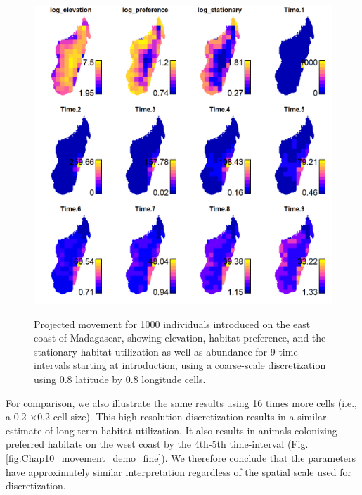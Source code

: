 \begin{figure}[!ht]
    \caption[Projected movement for using a coarse spatial resolution]{Projected movement for 1000 individuals introduced on the east coast of Madagascar, showing elevation, habitat preference, and the stationary habitat utilization as well as abundance for 9 time-intervals starting at introduction, using a coarse-scale discretization using 0.8 latitude by 0.8 longitude cells.}
    \includegraphics[width=5.5in]{Chap_10/Demo_cellsize08.png}
    \label{fig:Chap10_movement_demo_coarse}
\end{figure}

For comparison, we also illustrate the same results using 16 times more cells (i.e., a 0.2 \(\times\)0.2 cell size).  This high-resolution discretization results in a similar estimate of long-term habitat utilization. It also results in animals colonizing preferred habitats on the west coast by the 4th-5th time-interval (Fig. \ref{fig:Chap10_movement_demo_fine}).  We therefore conclude that the parameters have approximately similar interpretation regardless of the spatial scale used for discretization.   

